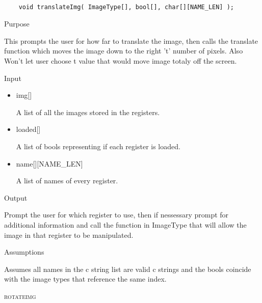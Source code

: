 \documentclass[pdftex, 11pt]{article}
\begin{document}
\begin{description}
		\begin{lstlisting}

	void translateImg( ImageType[], bool[], char[][NAME_LEN] );
		\end{lstlisting}

		\begin{description}
			\item{Purpose}
			
				This prompts the user for how far to translate the image, then calls the
				translate function which moves the image down to the right 't' number of
				pixels.  Also Won't let user choose t value that would move image totaly off
				the screen.

			\item{Input}

				\begin{itemize}

					\item{img[]}

						A list of all the images stored in the registers.

					\item{loaded[]}

						A list of bools representing if each register is loaded.

					\item{name[][NAME\_LEN]}

						A list of names of every register.

				\end{itemize}

			\item{Output}

				Prompt the user for which register to use, then if nessessary
				prompt for additional information and call the function
				in ImageType that will allow the image in that register to
				be manipulated.

			\item{Assumptions}

				Assumes all names in the c string list are valid c
				strings and the bools coincide with the image types that
				reference the same index.

		\end{description}



	\item{\textsc{rotateimg}}

		\begin{lstlisting}


\end{lstlisting}
\end{description}
\end{document}
